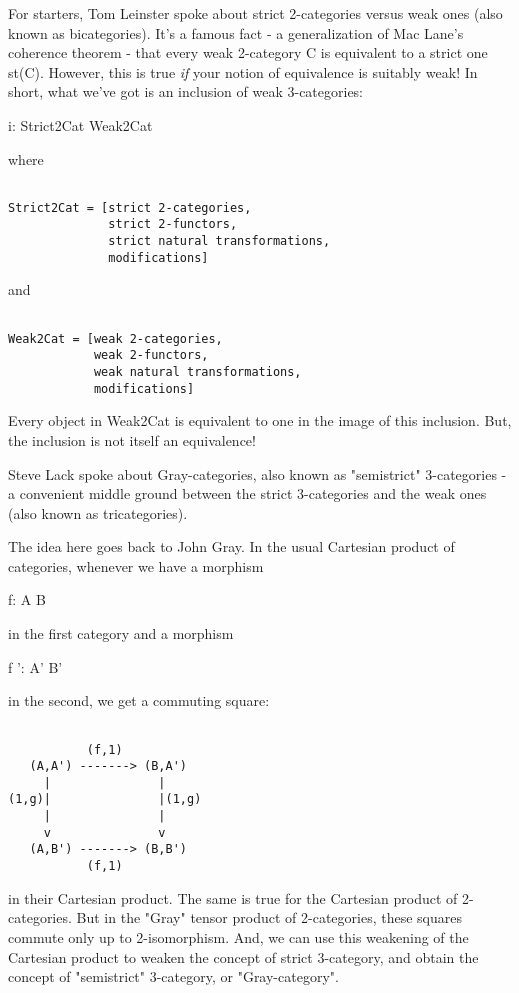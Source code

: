 For starters, Tom Leinster spoke about strict 2-categories versus weak
ones (also known as bicategories).  It's a famous fact - a
generalization of Mac Lane's coherence theorem - that every weak
2-category C is equivalent to a strict one st(C).  However, this is
true \emph{if} your notion of equivalence is suitably weak!  In
short, what we've got is an inclusion of weak 3-categories:

i: Strict2Cat \to  Weak2Cat

where 


\begin{verbatim}

Strict2Cat = [strict 2-categories, 
              strict 2-functors, 
              strict natural transformations,
              modifications]
\end{verbatim}
    
and 


\begin{verbatim}

Weak2Cat = [weak 2-categories,
            weak 2-functors,
            weak natural transformations,
            modifications]
\end{verbatim}
    
Every object in Weak2Cat is equivalent to one in the image of
this inclusion.  But, the inclusion is not itself an equivalence!

Steve Lack spoke about Gray-categories, also known as
"semistrict" 3-categories - a convenient middle ground
between the strict 3-categories and the weak ones (also known as
tricategories).

The idea here goes back to John Gray.  In the usual Cartesian 
product of categories, whenever we have a morphism

f: A \to  B

in the first category and a morphism

f ': A' \to  B'

in the second, we get a commuting square:
           

\begin{verbatim}

           (f,1)
   (A,A') -------> (B,A')
     |               |
(1,g)|               |(1,g)
     |               |
     v               v
   (A,B') -------> (B,B')
           (f,1)
\end{verbatim}
    

in their Cartesian product.  The same is true for the Cartesian
product of 2-categories.  But in the "Gray" tensor product
of 2-categories, these squares commute only up to 2-isomorphism.  And,
we can use this weakening of the Cartesian product to weaken the
concept of strict 3-category, and obtain the concept of
"semistrict" 3-category, or "Gray-category".

